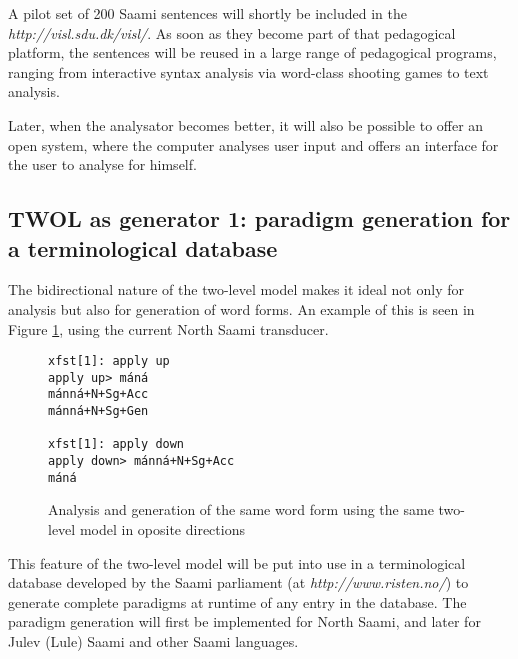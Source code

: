 \documentclass[a4paper,english]{article}
\begin{document}
A pilot set of 200 Saami sentences will shortly be included in the \textit{http://visl.sdu.dk/visl/}. As soon as they become part of that pedagogical platform, the sentences will be reused in a large range of pedagogical programs, ranging from interactive syntax analysis via word-class shooting games to text analysis.


Later, when the analysator becomes better, it will also be possible to offer an open system, where the computer analyses user input and offers an interface for the user to analyse for himself. 

\subsection{TWOL as generator 1: paradigm generation for a terminological database}\label{term}

The bidirectional nature of the two-level model makes it ideal not only for analysis but also for generation of word forms. An example of this is seen in Figure \ref{anagen}, using the current North Saami transducer.

\begin{figure}[htb]
\caption{Analysis and generation of the same word form using the same two-level model in oposite directions}
\begin{center}
\begin{verbatim}
xfst[1]: apply up
apply up> máná
mánná+N+Sg+Acc
mánná+N+Sg+Gen

xfst[1]: apply down
apply down> mánná+N+Sg+Acc
máná
\end{verbatim}
\end{center}
\label{anagen}
\end{figure}

This feature of the two-level model will be put into use in a terminological database developed by the Saami parliament (at \textit{http://www.risten.no/}) to generate complete paradigms at runtime of any entry in the database. The paradigm generation will first be implemented for North Saami, and later for Julev (Lule) Saami and other Saami languages.
\end{document}
